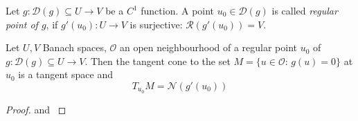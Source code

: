 \begin{definition}\label{definition_1.30}
	Let $g:\mathcal{D}(g)\subseteq U\to V$ be a $C^1$ function. A point $u_0\in\mathcal{D}(g)$ is called \emph{regular point of $g$}, if $g'(u_0):U\to V$ is surjective: $\mathcal{R}(g'(u_0)) = V$.
\end{definition}

\begin{theorem}\label{theorem_1.31}
	Let $U,V$ Banach spaces, $\mathcal{O}$ an open neighbourhood of a regular point $u_0$ of $g:\mathcal{D}(g)\subseteq U\to V$. Then the tangent cone to the set $M = \{u\in\mathcal{O}:\,g(u) = 0\}$ at $u_0$ is a tangent space and
	\[
		T_{u_0}M = \mathcal{N}(g'(u_0))
	\]
\end{theorem}
\begin{proof}
	\cite[Chapter 0.2.4]{Ioffe} and 
	\cite[Chapter 8, §10]{Ljusternik}
\end{proof}